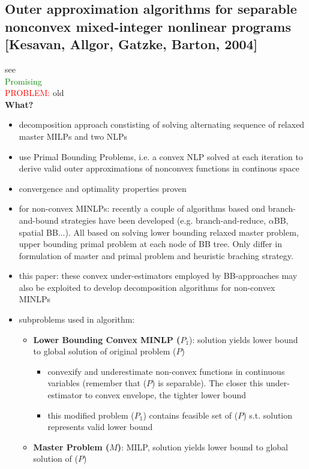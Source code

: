 \documentclass{article}
\begin{document}
\subsection{Outer approximation algorithms for separable nonconvex mixed-integer nonlinear programs [Kesavan, Allgor, Gatzke, Barton, 2004]}
\label{sec:OA_nonconvex}
see \cite{kesavan2004outer}\\
\textcolor{green}{Promising}\\
\textcolor{red}{PROBLEM:} old\\
\textbf{What?} 
\begin{itemize}
\item  decomposition approach constisting of solving alternating sequence of relaxed master MILPs and two NLPs
\item use Primal Bounding Problems, i.e. a convex NLP solved at each iteration to derive valid outer approximations of nonconvex functions in continous space
\item convergence and optimality properties proven
\item for non-convex MINLPs: recently a couple of algorithms based ond branch-and-bound strategies have been developed (e.g. branch-and-reduce, $\alpha$BB, spatial BB...). All based on solving lower bounding relaxed master problem, upper bounding primal problem at each node of BB tree. Only differ in formulation of master and primal problem and heuristic braching strategy.
\item this paper: these convex under-estimators employed by BB-approaches may also be exploited to develop decomposition algorithms for non-convex MINLPs
\item subproblems used in algorithm:	
	\begin{itemize}
	\item \textbf{Lower Bounding Convex MINLP ($P_1$}): solution yields lower bound to global solution of original problem ($P$)
		\begin{itemize}
		\item convexify and underestimate non-convex functions in continuous variables (remember that ($P$) is separable). The closer this under-estimator to convex envelope, the tighter lower bound
		\item this modified problem ($P_1$) contains feasible set of ($P$) s.t. solution represents valid lower bound
		\end{itemize}
	\item \textbf{Master Problem ($M$)}: MILP, solution yields lower bound to global solution of ($P$)

\end{itemize}
\end{itemize}
\end{document}
